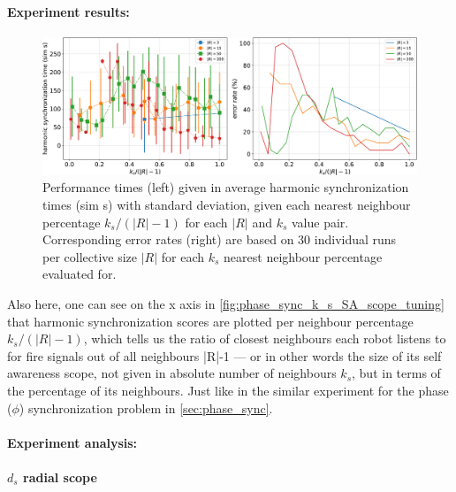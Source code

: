				\paragraph{Experiment results:\nl}
				
				\begin{figure}[ht!]
					\centering
					\includegraphics[width=\linewidth]{Assets/DocSegments/Chapters/ExperimentsAndResults/Figures/PerfScores/phase_and_freq_sync_k_s_SA_scope_tuning_experiment_performance.pdf}
					\caption[Experiment results for $\phi$ \& $\omega$ synchronization $k_s$ SA scope tuning experiment.]{Performance times (left) given in average harmonic synchronization times (sim s) with standard deviation, given each nearest neighbour percentage $k_s/(|R|-1)$ for each $|R|$ and $k_s$ value pair. Corresponding error rates (right) are based on 30 individual runs per collective size $|R|$ for each $k_s$ nearest neighbour percentage evaluated for.}
					\label{fig:phase_and_freq_sync_k_s_SA_scope_tuning}
				\end{figure}

				Also here, one can see on the x axis in \ref{fig:phase_sync_k_s_SA_scope_tuning} that harmonic synchronization scores are plotted per neighbour percentage $k_s/(|R|-1)$, which tells us the ratio of closest neighbours each robot listens to for fire signals out of all neighbours |R|-1 — or in other words the size of its self awareness scope, not given in absolute number of neighbours $k_s$, but in terms of the percentage of its neighbours. Just like in the similar experiment for the phase ($\phi$) synchronization problem in \ref{sec:phase_sync}.

				\paragraph{Experiment analysis:\nl}
			
			
			\paragraph{$d_s$ radial scope}
				
